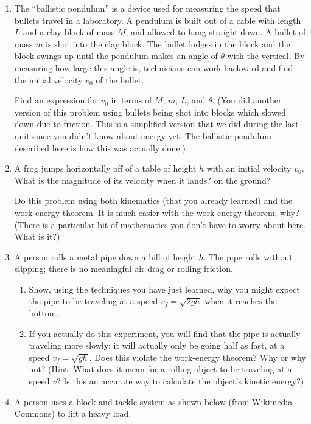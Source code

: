 \documentclass[12pt]{article}
\begin{document}
\begin{enumerate}
\item{The ``ballistic pendulum'' is a device used for measuring the speed that bullets travel in a laboratory. A pendulum is built out of a cable with length $L$ and a clay block of mass $M$, and allowed to hang straight down. A bullet of mass $m$ is shot into the clay block.
The bullet lodges in the block and the block swings up until the pendulum makes an angle of $\theta$ with the vertical. By measuring how large this angle is, technicians can work backward and find the initial velocity $v_0$ of the bullet.

Find an expression for $v_0$ in terms of $M$, $m$, $L$, and $\theta$. (You did another version of this problem using bullets being shot into blocks which slowed 
down due to friction. This is a simplified version that we did during the last unit since you didn't know about energy yet. The ballistic pendulum described here 
is how this was actually done.)
}

\item{A frog jumps horizontally off of a table of height $h$ with an initial velocity $v_0$. What is the magnitude of its velocity when it lands?
    on the ground?

Do this problem using both kinematics (that you already learned) and the work-energy theorem. It is much easier with the work-energy theorem; why? (There is a particular
bit of mathematics you don't have to worry about here. What is it?)}



\item A person rolls a metal pipe down a hill of height $h$. The pipe rolls without slipping; there is no meaningful air drag or rolling friction.

\begin{enumerate}
\item Show, using the techniques you have just learned, why you might expect the pipe to be traveling at a speed $v_f = \sqrt{2gh}$ when it reaches the bottom.
\item If you actually do this experiment, you will find that the pipe is actually traveling more slowly; it will actually only be going half as fast, at a speed $v_f = \sqrt {gh}$. Does this violate the work-energy theorem? Why or why not? (Hint: What does it mean for a rolling object to be traveling at a speed $v$? Is this an
accurate way to calculate the object's kinetic energy?)
\end{enumerate}


\item{A person uses a block-and-tackle system as shown below (from Wikimedia Commons) to lift a heavy load.

}
\end{enumerate}
\end{document}

